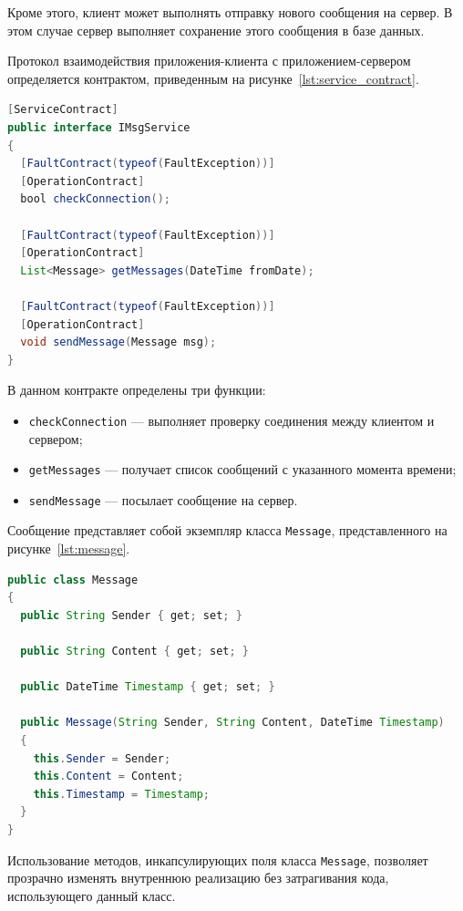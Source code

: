 Кроме этого, клиент может выполнять отправку нового сообщения на сервер.
В этом случае сервер выполняет сохранение этого сообщения в базе данных.

Протокол взаимодействия приложения-клиента с приложением-сервером определяется контрактом,
приведенным на рисунке~\ref{lst:service_contract}.

\begin{lstlisting}[caption=Контракт взаимодействия клиента с сервером,
label=lst:service_contract,language={Java},basicstyle=\scriptsize\ttfamily]
[ServiceContract]
public interface IMsgService
{
  [FaultContract(typeof(FaultException))]
  [OperationContract]
  bool checkConnection();

  [FaultContract(typeof(FaultException))]
  [OperationContract]
  List<Message> getMessages(DateTime fromDate);

  [FaultContract(typeof(FaultException))]
  [OperationContract]
  void sendMessage(Message msg);
}    
\end{lstlisting}

В данном контракте определены три функции:
\begin{itemize}
\item \texttt{checkConnection} --- выполняет проверку соединения между клиентом и сервером;
\item \texttt{getMessages} --- получает список сообщений с указанного момента времени;
\item \texttt{sendMessage} --- посылает сообщение на сервер.
\end{itemize}

Сообщение представляет собой экземпляр класса \texttt{Message}, 
представленного на рисунке~\ref{lst:message}.

\begin{lstlisting}[caption=Класс \texttt{Message},
label=lst:message,language={Java},basicstyle=\scriptsize\ttfamily]
public class Message
{
  public String Sender { get; set; }

  public String Content { get; set; }
  
  public DateTime Timestamp { get; set; }
  
  public Message(String Sender, String Content, DateTime Timestamp)
  {
    this.Sender = Sender;
    this.Content = Content;
    this.Timestamp = Timestamp;
  }
}
\end{lstlisting}

Использование методов, инкапсулирующих поля класса \texttt{Message},
позволяет прозрачно изменять внутреннюю реализацию без
затрагивания кода, использующего данный класс.

